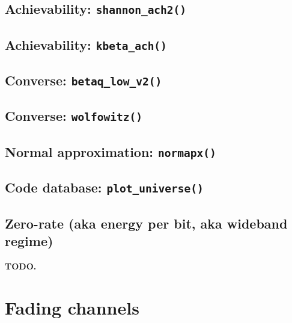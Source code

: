 \documentclass[a4paper,11p]{memoir}
\begin{document}
\cprotect\section{Achievability: \verb|shannon_ach2()|}

\cprotect\section{Achievability: \verb|kbeta_ach()|}

\cprotect\section{Converse: \verb|betaq_low_v2()|}

\cprotect\section{Converse: \verb|wolfowitz()|}

\cprotect\section{Normal approximation: \verb|normapx()|}

\cprotect\section{Code database: \verb|plot_universe()|}

\cprotect\section{Zero-rate (aka energy per bit, aka wideband regime)}
\textbf{TODO.}

\chapter{Fading channels}


\end{document}
